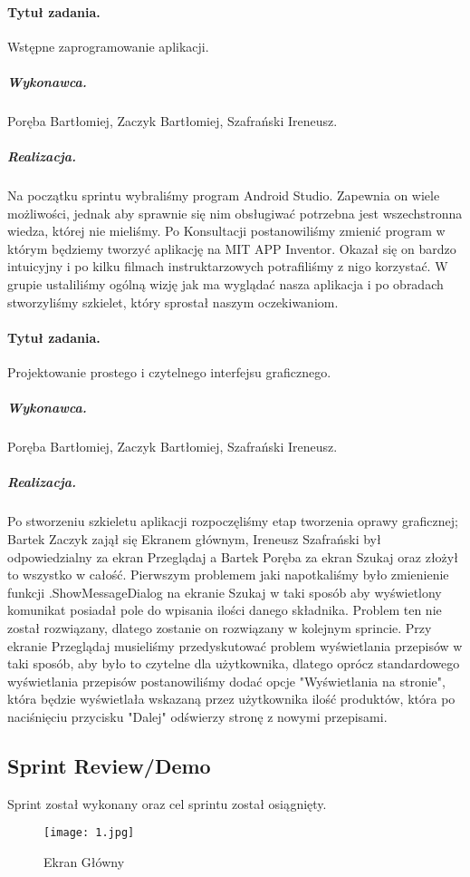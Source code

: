 \documentclass[a4paper]{article}
\begin{document}
	\paragraph{Tytuł zadania.} Wstępne zaprogramowanie aplikacji.
	\subparagraph{Wykonawca.} Poręba Bartłomiej, Zaczyk Bartłomiej, Szafrański Ireneusz.
	\subparagraph{Realizacja.} Na początku sprintu wybraliśmy program Android Studio. Zapewnia on wiele możliwości, jednak aby sprawnie się nim obsługiwać potrzebna jest wszechstronna wiedza, której nie mieliśmy. Po Konsultacji postanowiliśmy zmienić program w którym będziemy tworzyć aplikację na MIT APP Inventor. Okazał się on bardzo intuicyjny i po kilku filmach instruktarzowych potrafiliśmy z nigo korzystać. W grupie ustaliliśmy ogólną wizję jak ma wyglądać nasza aplikacja i po obradach stworzyliśmy szkielet, który sprostał naszym oczekiwaniom.
	
	\paragraph{Tytuł zadania.} Projektowanie prostego i czytelnego interfejsu graficznego.
	\subparagraph{Wykonawca.} Poręba Bartłomiej, Zaczyk Bartłomiej, Szafrański Ireneusz.
	\subparagraph{Realizacja.}
	Po stworzeniu szkieletu aplikacji rozpoczęliśmy etap tworzenia oprawy graficznej; Bartek Zaczyk zajął się Ekranem głównym, Ireneusz Szafrański był odpowiedzialny za ekran Przeglądaj a Bartek Poręba za ekran Szukaj oraz złożył to wszystko w całość. Pierwszym problemem jaki napotkaliśmy było zmienienie funkcji .ShowMessageDialog na ekranie Szukaj w taki sposób aby wyświetlony komunikat posiadał pole do wpisania ilości danego składnika. Problem ten nie został rozwiązany, dlatego zostanie on rozwiązany w kolejnym sprincie. Przy ekranie Przeglądaj musieliśmy przedyskutować problem wyświetlania przepisów w taki sposób, aby było to czytelne dla użytkownika, dlatego oprócz standardowego wyświetlania przepisów postanowiliśmy dodać opcje "Wyświetlania na stronie", która będzie wyświetlała wskazaną przez użytkownika ilość produktów, która po naciśnięciu przycisku "Dalej" odświerzy stronę z nowymi przepisami.
	
	\subsection{Sprint Review/Demo}
	Sprint został wykonany oraz cel sprintu został osiągnięty.
	\begin{figure}
		\centering
		\texttt{[image: 1.jpg]}
		\caption{Ekran Główny}
		\label{glowny}
	\end{figure}
	
\end{document}
